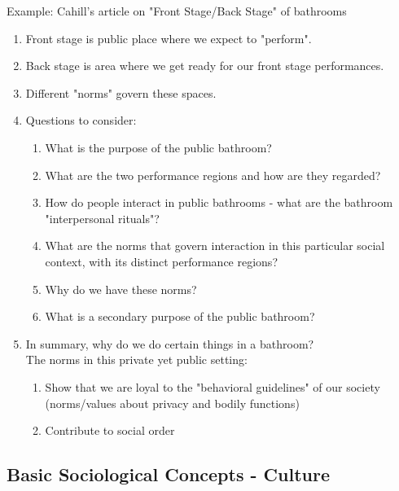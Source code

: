 \documentclass[12pt,a4paper]{article}
\begin{document}
\begin{enumerate}
\begin{enumerate}
\begin{eg}{Example: Cahill's article on "Front Stage/Back Stage" of bathrooms}
\begin{enumerate}
		\item Front stage is public place where we expect to "perform".
		\item Back stage is area where we get ready for our front stage performances. 
		\item Different "norms" govern these spaces. 
		\item Questions to consider: 
		\begin{enumerate}
			\item What is the purpose of the public bathroom?
			\item What are the two performance regions and how are they regarded? 
			\item How do people interact in public bathrooms - what are the bathroom "interpersonal rituals"?
			\item What are the norms that govern interaction in this particular social context, with its distinct performance regions? 
			\item Why do we have these norms? 
			\item What is a secondary purpose of the public bathroom? 
		\end{enumerate}
		\item In summary, why do we do certain things in a bathroom? \\
		The norms in this private yet public setting: 
			\begin{enumerate}
				\item Show that we are loyal to the "behavioral guidelines" of our society (norms/values about privacy and bodily functions)
				\item Contribute to social order
			\end{enumerate}
		\end{enumerate}
		\end{eg}
	\end{enumerate}
\end{enumerate}

\subsection{Basic Sociological Concepts - Culture}
\end{document}
